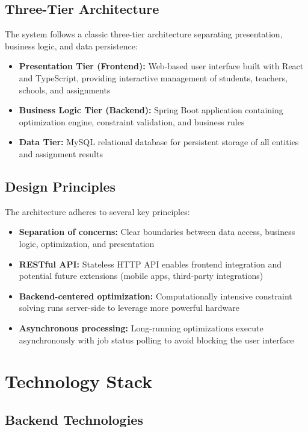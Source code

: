 \documentclass[12pt,a4paper]{report}
\begin{document}
\subsection{Three-Tier Architecture}

The system follows a classic three-tier architecture separating presentation, business logic, and data persistence:

\begin{itemize}
    \item \textbf{Presentation Tier (Frontend):} Web-based user interface built with React and TypeScript, providing interactive management of students, teachers, schools, and assignments
    \item \textbf{Business Logic Tier (Backend):} Spring Boot application containing optimization engine, constraint validation, and business rules
    \item \textbf{Data Tier:} MySQL relational database for persistent storage of all entities and assignment results
\end{itemize}

\subsection{Design Principles}

The architecture adheres to several key principles:

\begin{itemize}
    \item \textbf{Separation of concerns:} Clear boundaries between data access, business logic, optimization, and presentation
    \item \textbf{RESTful API:} Stateless HTTP API enables frontend integration and potential future extensions (mobile apps, third-party integrations)
    \item \textbf{Backend-centered optimization:} Computationally intensive constraint solving runs server-side to leverage more powerful hardware
    \item \textbf{Asynchronous processing:} Long-running optimizations execute asynchronously with job status polling to avoid blocking the user interface
\end{itemize}

\section{Technology Stack}

\subsection{Backend Technologies}
\end{document}
